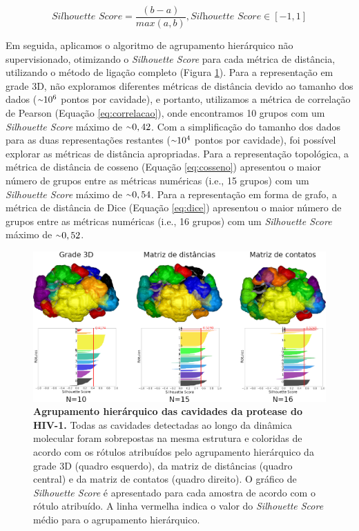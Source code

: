 \documentclass[Portugues]{phdquali}
\newcommand{\aproximadamente}{\raise.2ex\hbox{$\scriptstyle\sim$}}
\def\ie{i.e.\onedot}
\begin{document}
\begin{equation}
  \textit{Silhouette Score} = \frac{(b - a)}{max(a, b)}, \textit{Silhouette Score} \in [-1, 1]
  \label{eq:silhouette-score}
\end{equation}

Em seguida, aplicamos o algoritmo de agrupamento hierárquico não supervisionado, otimizando o \textit{Silhouette Score} para cada métrica de distância, utilizando o método de ligação completo (Figura \ref{fig:hiv-1-clustering-results}). Para a representação em grade 3D, não exploramos diferentes métricas de distância devido ao tamanho dos dados ($\aproximadamente 10^6$ pontos por cavidade), e portanto, utilizamos a métrica de correlação de Pearson (Equação \ref{eq:correlacao}), onde encontramos 10 grupos com um \textit{Silhouette Score} máximo de $\aproximadamente 0,42$. Com a simplificação do tamanho dos dados para as duas representações restantes ($\aproximadamente 10^4$ pontos por cavidade), foi possível explorar as métricas de distância apropriadas. Para a representação topológica, a métrica de distância de cosseno (Equação \ref{eq:cosseno}) apresentou o maior número de grupos entre as métricas numéricas (\ie, 15 grupos) com um \textit{Silhouette Score} máximo de $\aproximadamente 0,54$. Para a representação em forma de grafo, a métrica de distância de Dice (Equação \ref{eq:dice}) apresentou o maior número de grupos entre as métricas numéricas (\ie, 16 grupos) com um \textit{Silhouette Score} máximo de $\aproximadamente 0,52$.

\begin{figure}[h]
  \centering
  \includegraphics[scale=1.1]{images/HIV-1-clustering-results.png}
  \caption[Agrupamento hierárquico das cavidades da protease do HIV-1]{\textbf{Agrupamento hierárquico das cavidades da protease do HIV-1.} Todas as cavidades detectadas ao longo da dinâmica molecular foram sobrepostas na mesma estrutura e coloridas de acordo com os rótulos atribuídos pelo agrupamento hierárquico da grade 3D (quadro esquerdo), da matriz de distâncias (quadro central) e da matriz de contatos (quadro direito). O gráfico de \textit{Silhouette Score} é apresentado para cada amostra de acordo com o rótulo atribuído. A linha vermelha indica o valor do \textit{Silhouette Score} médio para o agrupamento hierárquico.}
  \label{fig:hiv-1-clustering-results}
\end{figure}
\end{document}
